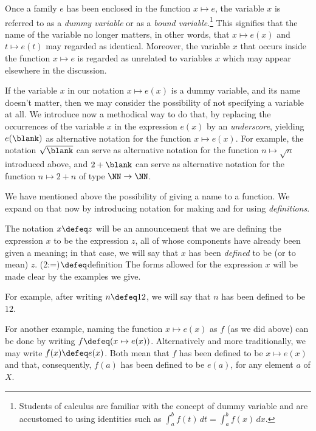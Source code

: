 Once a family $e$ has been enclosed in the function $x \mapsto e$, the variable $x$ is referred to as a \emph{dummy variable} or as a \emph{bound variable}.\footnote{Students of calculus are familiar with the concept of dummy variable
and are accustomed to using identities such as $\int_a^b f(t)\,dt = \int_a^b f(x)\,dx$.} This signifies that the name of the variable no longer
matters, in other words, that $x \mapsto e(x)$ and $t \mapsto e(t)$ may regarded as identical.  Moreover, the variable $x$ that occurs inside
the function $x \mapsto e$ is regarded as unrelated to variables $x$ which may appear elsewhere in the discussion.

If the variable $x$ in our notation $x \mapsto e(x)$ is a dummy variable, and its name doesn't matter, then we may consider the possibility of
not specifying a variable at all.  We introduce now a methodical way to do that, by replacing the occurrences of the variable $x$ in the
expression $e(x)$ by an \emph{underscore},
yielding $e(\blank)$ as alternative notation for the function $x \mapsto e(x)$.
For example, the
notation $\sqrt{\vphantom{n}\blank}$ can serve as alternative notation for the function $n \mapsto \sqrt n$ introduced above, and $2 + \blank$ can serve as
alternative notation for the function $n \mapsto 2 + n$ of type $\NN \to \NN$.

We have mentioned above the possibility of giving a name to a function.
We expand on that now by introducing notation for making and for using \emph{definitions}.

The notation $x \defeq z$ will be an announcement that we are defining
the expression $x$ to be the expression $z$, all of whose components have already been given a meaning;
in that case, we will say that $x$ has been \emph{defined} to be (or to mean) $z$.%
\glossary(2:=){$\protect\defeq$}{definition}
The forms allowed for the expression $x$ will be made clear by the examples we give.

For example, after writing $n \defeq 12$, we will say that $n$ has
been defined to be $12$.

For another example, naming the function $x \mapsto e(x)$ as $f$
(as we did above) can be done by writing $f \defeq ( x \mapsto e(x) )$.
Alternatively and more traditionally, we may write $f(x) \defeq e(x)$.
Both mean that $f$ has been defined to be $x \mapsto e(x)$
and that, consequently, $f(a)$ has been defined to be $e(a)$,
for any element $a$ of $X$.

